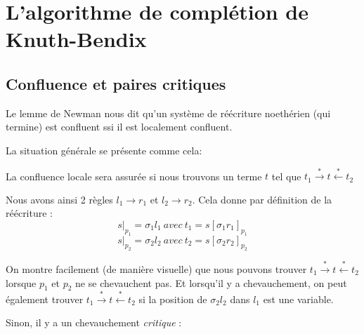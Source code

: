 \documentclass[11pt]{book}
\begin{document}
\section{L'algorithme de complétion de Knuth-Bendix}
\subsection{Confluence et paires critiques}
Le lemme de Newman nous dit qu'un système de réécriture noethérien (qui termine) est confluent 
ssi il est localement confluent.

La situation générale se présente comme cela:
\begin{center}
\end{center}
La confluence locale sera assurée si nous trouvons un terme $t$ tel que 
$t_1 \overset{*}{\rightarrow} t \overset{*}{\leftarrow} t_2$ 

Nous avons ainsi 2 règles $l_1 \rightarrow r_1$ et $l_2 \rightarrow r_2$. Cela donne par définition de la réécriture :
$$ s|_{p_1} = \sigma_1 l_1\ avec\ t_1=s[\sigma_1 r_1]_{p_1} $$
$$ s|_{p_2} = \sigma_2 l_2\ avec\ t_2=s[\sigma_2 r_2]_{p_2} $$

On montre facilement (de manière visuelle) que nous pouvons trouver 
$t_1 \overset{*}{\rightarrow} t \overset{*}{\leftarrow} t_2$ lorsque
$p_1$ et $p_2$ ne se chevauchent pas. Et lorsqu'il y a chevauchement, on peut également trouver 
$t_1 \overset{*}{\rightarrow} t \overset{*}{\leftarrow} t_2$ si la position de $\sigma_2 l_2$ dans $l_1$ 
 est une variable.

\vspace{0.2cm}
Sinon, il y a un chevauchement \textit{critique} :
\begin{center}
	\end{center}
\end{document}
